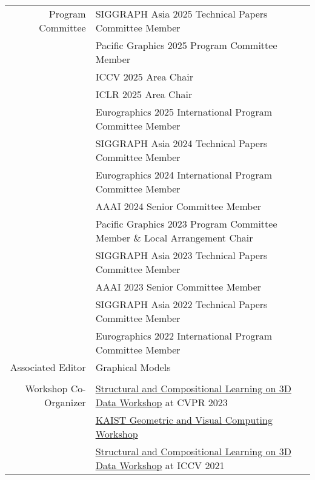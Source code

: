 \documentclass[letterpaper,10pt]{article} %
\newcommand{\blankline}{\quad\pagebreak[2]}
\begin{document}
{{\begin{tabular}{r|p{11cm}}
Program Committee
    & SIGGRAPH Asia 2025 Technical Papers Committee Member\\
    & Pacific Graphics 2025 Program Committee Member\\
    & ICCV 2025 Area Chair\\
    & ICLR 2025 Area Chair\\
    & Eurographics 2025 International Program Committee Member\\
    & SIGGRAPH Asia 2024 Technical Papers Committee Member\\
    & Eurographics 2024 International Program Committee Member\\
    & AAAI 2024 Senior Committee Member\\
    & Pacific Graphics 2023 Program Committee Member \& Local Arrangement Chair\\
    & SIGGRAPH Asia 2023 Technical Papers Committee Member\\
    & AAAI 2023 Senior Committee Member\\
    & SIGGRAPH Asia 2022 Technical Papers Committee Member\\
    & Eurographics 2022 International Program Committee Member\\
Associated Editor
    & Graphical Models \\
    &\\
Workshop Co-Organizer
    & \href{https://struco3d.github.io/cvpr2023/}{Structural and Compositional Learning on 3D Data Workshop} at CVPR 2023\\
    & \href{https://mhsung.github.io/gvc-workshop-2022/}{KAIST Geometric and Visual Computing Workshop}\\
    & \href{https://struco3d.github.io/iccv2021/}{Structural and Compositional Learning on 3D Data Workshop} at ICCV 2021\\
\end{tabular}\\

\blankline



}}
\end{document}
